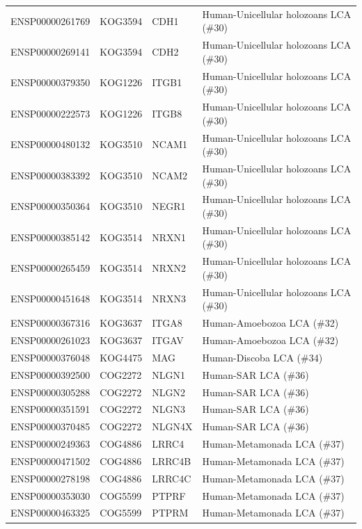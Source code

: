 \begin{longtable}[l]{llll}
\rowcolor{gray!6}  ENSP00000261769 & KOG3594 & CDH1 & Human-Unicellular holozoans LCA (\#30)\\
ENSP00000269141 & KOG3594 & CDH2 & Human-Unicellular holozoans LCA (\#30)\\
\rowcolor{gray!6}  ENSP00000379350 & KOG1226 & ITGB1 & Human-Unicellular holozoans LCA (\#30)\\
ENSP00000222573 & KOG1226 & ITGB8 & Human-Unicellular holozoans LCA (\#30)\\
\rowcolor{gray!6}  ENSP00000480132 & KOG3510 & NCAM1 & Human-Unicellular holozoans LCA (\#30)\\
ENSP00000383392 & KOG3510 & NCAM2 & Human-Unicellular holozoans LCA (\#30)\\
\rowcolor{gray!6}  ENSP00000350364 & KOG3510 & NEGR1 & Human-Unicellular holozoans LCA (\#30)\\
ENSP00000385142 & KOG3514 & NRXN1 & Human-Unicellular holozoans LCA (\#30)\\
\rowcolor{gray!6}  ENSP00000265459 & KOG3514 & NRXN2 & Human-Unicellular holozoans LCA (\#30)\\
ENSP00000451648 & KOG3514 & NRXN3 & Human-Unicellular holozoans LCA (\#30)\\
\rowcolor{gray!6}  ENSP00000367316 & KOG3637 & ITGA8 & Human-Amoebozoa LCA (\#32)\\
ENSP00000261023 & KOG3637 & ITGAV & Human-Amoebozoa LCA (\#32)\\
\rowcolor{gray!6}  ENSP00000376048 & KOG4475 & MAG & Human-Discoba LCA (\#34)\\
ENSP00000392500 & COG2272 & NLGN1 & Human-SAR LCA (\#36)\\
\rowcolor{gray!6}  ENSP00000305288 & COG2272 & NLGN2 & Human-SAR LCA (\#36)\\
ENSP00000351591 & COG2272 & NLGN3 & Human-SAR LCA (\#36)\\
\rowcolor{gray!6}  ENSP00000370485 & COG2272 & NLGN4X & Human-SAR LCA (\#36)\\
ENSP00000249363 & COG4886 & LRRC4 & Human-Metamonada LCA (\#37)\\
\rowcolor{gray!6}  ENSP00000471502 & COG4886 & LRRC4B & Human-Metamonada LCA (\#37)\\
ENSP00000278198 & COG4886 & LRRC4C & Human-Metamonada LCA (\#37)\\
\rowcolor{gray!6}  ENSP00000353030 & COG5599 & PTPRF & Human-Metamonada LCA (\#37)\\
ENSP00000463325 & COG5599 & PTPRM & Human-Metamonada LCA (\#37)\\
\bottomrule
\end{longtable}
